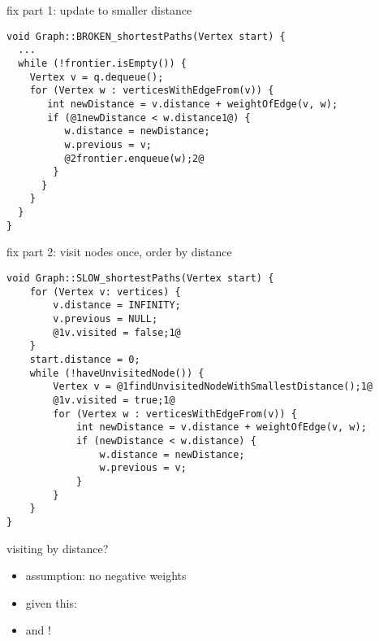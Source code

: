 \begin{frame}[fragile,label=fixPartOne]{fix part 1: update to smaller distance}
\begin{lstlisting}
void Graph::BROKEN_shortestPaths(Vertex start) {
  ... 
  while (!frontier.isEmpty()) {
    Vertex v = q.dequeue();
    for (Vertex w : verticesWithEdgeFrom(v)) {
       int newDistance = v.distance + weightOfEdge(v, w);
       if (@1newDistance < w.distance1@) {
          w.distance = newDistance;
          w.previous = v;
          @2frontier.enqueue(w);2@
        } 
      }
    }
  }
}
\end{lstlisting}
\end{frame}

\begin{frame}[fragile,label=withDistance]{fix part 2: visit nodes once, order by distance}
\begin{lstlisting}
void Graph::SLOW_shortestPaths(Vertex start) {
    for (Vertex v: vertices) {
        v.distance = INFINITY;
        v.previous = NULL;
        @1v.visited = false;1@
    }
    start.distance = 0;
    while (!haveUnvisitedNode()) {
        Vertex v = @1findUnvisitedNodeWithSmallestDistance();1@
        @1v.visited = true;1@
        for (Vertex w : verticesWithEdgeFrom(v)) {
            int newDistance = v.distance + weightOfEdge(v, w);
            if (newDistance < w.distance) {
                w.distance = newDistance;
                w.previous = v;
            } 
        }
    }
}
\end{lstlisting}
\end{frame}

\begin{frame}{visiting by distance?}
\begin{itemize}
\item assumption: no negative weights
\item given this: 
\item and !
\end{itemize}
\end{frame}

